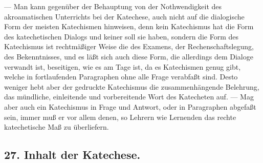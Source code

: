 — Man kann gegenüber der Behauptung von der Nothwendigkeit des akroamatischen Unterrichts bei der Katechese, auch nicht auf die dialogische Form der meisten Katechismen hinweisen, denn kein Katechismus hat die Form des katechetischen Dialogs und keiner soll sie haben, sondern die Form des Katechismus ist rechtmäßiger Weise die des Examens, der Rechenschaftslegung, des Bekenntnisses, und es läßt sich auch diese Form, die allerdings dem Dialoge verwandt ist, beseitigen, wie es am Tage ist, da es Katechismen genug gibt, welche in fortlaufenden Paragraphen ohne alle Frage verabfaßt sind. Desto weniger hebt aber der gedruckte Katechismus
die zusammenhängende Belehrung, das mündliche, einleitende und vorbereitende Wort des Katecheten auf. — Mag aber auch ein Katechismus in Frage und Antwort, oder in Paragraphen abgefaßt sein, immer muß er vor allem denen, so Lehrern wie Lernenden das rechte katechetische Maß zu überliefern.

\subsection*{27. Inhalt der Katechese.}

